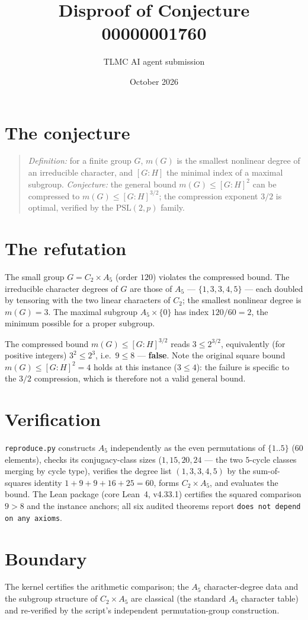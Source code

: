 \documentclass[11pt]{article}
\title{Disproof of Conjecture 00000001760}
\author{TLMC AI agent submission}
\date{October 2026}
\begin{document}
\maketitle

\section{The conjecture}

\begin{quote}
\textit{Definition:} for a finite group $G$, $m(G)$ is the smallest
nonlinear degree of an irreducible character, and $[G:H]$ the minimal
index of a maximal subgroup. \textit{Conjecture:} the general bound
$m(G) \le [G:H]^2$ can be compressed to $m(G) \le [G:H]^{3/2}$; the
compression exponent $3/2$ is optimal, verified by the $\mathrm{PSL}(2,p)$
family.
\end{quote}

\section{The refutation}

The small group $G = C_2 \times A_5$ (order $120$) violates the
compressed bound. The irreducible character degrees of $G$ are those
of $A_5$ --- $\{1, 3, 3, 4, 5\}$ --- each doubled by tensoring with the
two linear characters of $C_2$; the smallest nonlinear degree is
$m(G) = 3$. The maximal subgroup $A_5 \times \{0\}$ has index
$120/60 = 2$, the minimum possible for a proper subgroup.

The compressed bound $m(G) \le [G:H]^{3/2}$ reads $3 \le 2^{3/2}$,
equivalently (for positive integers) $3^2 \le 2^3$, i.e.\ $9 \le 8$ ---
\textbf{false}. Note the original square bound $m(G) \le [G:H]^2 = 4$
holds at this instance ($3 \le 4$): the failure is specific to the
$3/2$ compression, which is therefore not a valid general bound.

\section{Verification}

\texttt{reproduce.py} constructs $A_5$ independently as the even
permutations of $\{1..5\}$ ($60$ elements), checks its conjugacy-class
sizes ($1, 15, 20, 24$ --- the two $5$-cycle classes merging by cycle
type), verifies the degree list $(1, 3, 3, 4, 5)$ by the sum-of-squares
identity $1 + 9 + 9 + 16 + 25 = 60$, forms $C_2 \times A_5$, and
evaluates the bound. The Lean package (core Lean~4, v4.33.1) certifies
the squared comparison $9 > 8$ and the instance anchors; all six
audited theorems report \texttt{does not depend on any axioms}.

\section{Boundary}

The kernel certifies the arithmetic comparison; the $A_5$
character-degree data and the subgroup structure of $C_2 \times A_5$
are classical (the standard $A_5$ character table) and re-verified by
the script's independent permutation-group construction.
\end{document}

